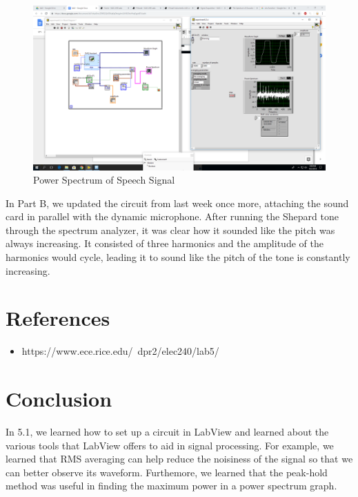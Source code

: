 \documentclass[10pt]{article}
\begin{document}
\begin{centering}
	\begin{figure} [H]
		\centering
		\includegraphics[scale=0.22]{images/mic.png}
		\caption{Power Spectrum of Speech Signal}
		\label{fig:mic}
	\end{figure}
\end{centering}


In Part B, we updated the circuit from last week once more, attaching the sound card in parallel with the dynamic microphone.  After running the Shepard tone through the spectrum analyzer, it was clear how it sounded like the pitch was always increasing. It consisted of three harmonics and the amplitude of the harmonics would cycle, leading it to sound like the pitch of the tone is constantly increasing. 


\section{References}

\begin{itemize}
	\item 	https://www.ece.rice.edu/~dpr2/elec240/lab5/
\end{itemize}

\medskip


\section{Conclusion}
In 5.1, we learned how to set up a circuit in LabView and learned about the various tools that LabView offers to aid in signal processing. For example, we learned that RMS averaging can help reduce the noisiness of the signal so that we can better observe its waveform. Furthemore, we learned that the peak-hold method was useful in finding the maximum power in a power spectrum graph. 
\end{document}
